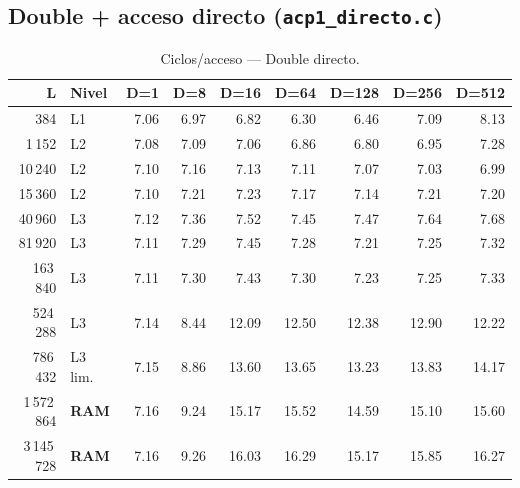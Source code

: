 \documentclass[12pt,a4paper]{article}
\newcommand{\cverde}[1]{\textcolor{verde}{#1}}
\newcommand{\cnaranja}[1]{\textcolor{naranja}{#1}}
\newcommand{\crojo}[1]{\textcolor{rojo}{#1}}
\begin{document}
\subsection{Double + acceso directo (\texttt{acp1\_directo.c})}

\begin{table}[H]
\centering
\caption{Ciclos/acceso --- Double directo.}
\label{tab:double_dir}
\setlength{\tabcolsep}{4pt}\footnotesize
\begin{tabular}{rlrrrrrrr}
\toprule
\textbf{L} & \textbf{Nivel} & \textbf{D=1} & \textbf{D=8} & \textbf{D=16} & \textbf{D=64} & \textbf{D=128} & \textbf{D=256} & \textbf{D=512} \\
\midrule
384         & L1         & \cverde{7.06}  & \cverde{6.97} & \cverde{6.82} & \cverde{6.30} & \cverde{6.46} & \cverde{7.09}  & \cnaranja{8.13} \\
1\,152      & L2         & \cverde{7.08}  & \cverde{7.09} & \cverde{7.06} & \cverde{6.86} & \cverde{6.80} & \cverde{6.95}  & \cverde{7.28} \\
10\,240     & L2         & \cverde{7.10}  & \cverde{7.16} & \cverde{7.13} & \cverde{7.11} & \cverde{7.07} & \cverde{7.03}  & \cverde{6.99} \\
15\,360     & L2         & \cverde{7.10}  & \cverde{7.21} & \cverde{7.23} & \cverde{7.17} & \cverde{7.14} & \cverde{7.21}  & \cverde{7.20} \\
40\,960     & L3         & \cverde{7.12}  & \cverde{7.36} & \cverde{7.52} & \cverde{7.45} & \cverde{7.47} & \cverde{7.64}  & \cverde{7.68} \\
81\,920     & L3         & \cverde{7.11}  & \cverde{7.29} & \cverde{7.45} & \cverde{7.28} & \cverde{7.21} & \cverde{7.25}  & \cverde{7.32} \\
163\,840    & L3         & \cverde{7.11}  & \cverde{7.30} & \cverde{7.43} & \cverde{7.30} & \cverde{7.23} & \cverde{7.25}  & \cverde{7.33} \\
524\,288    & L3         & \cverde{7.14}  & \cnaranja{8.44} & \crojo{12.09} & \crojo{12.50} & \crojo{12.38} & \crojo{12.90} & \crojo{12.22} \\
786\,432    & L3 lim.    & \cverde{7.15}  & \cnaranja{8.86} & \crojo{13.60} & \crojo{13.65} & \crojo{13.23} & \crojo{13.83} & \crojo{14.17} \\
1\,572\,864 & \textbf{RAM} & \cverde{7.16} & \cnaranja{9.24} & \crojo{15.17} & \crojo{15.52} & \crojo{14.59} & \crojo{15.10} & \crojo{15.60} \\
3\,145\,728 & \textbf{RAM} & \cverde{7.16} & \cnaranja{9.26} & \crojo{16.03} & \crojo{16.29} & \crojo{15.17} & \crojo{15.85} & \crojo{16.27} \\
\bottomrule
\end{tabular}
\end{table}
\end{document}
